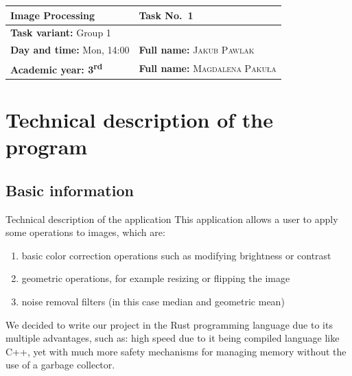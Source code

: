 \documentclass[12pt]{article}
\theoremstyle{definition}
\begin{document}
\pagestyle{fancy}
\fancyhead{}
\fancyfoot[C]{\thepage}

\thispagestyle{empty}
\renewcommand{\arraystretch}{2}
\begin{flushleft}
    \begin{tabularx}{0.95\textwidth}{|X|X|}
        \hline
        \bf \large Image Processing                   & \bf \large Task No.~1                           \\ \hline
        \multicolumn{2}{|l|}{
            \textbf{Task variant:} Group 1
        }                                                                                               \\ \hline
        \textbf{Day and time:} Mon, 14:00             & \textbf{Full name:} \textsc{Jakub Pawlak}       \\
        \textbf{Academic year: 3\textsuperscript{rd}} & \textbf{Full name:} \textsc{Magdalena Paku\l a} \\
        \hline
    \end{tabularx}
\end{flushleft}
\vspace{1em}
\renewcommand{\arraystretch}{1}

\section{Technical description of the program}
\subsection{Basic information}

Technical description of the application
This application allows a user to apply some operations to images, which are:
\begin{enumerate}
    \item basic color correction operations such as modifying brightness or contrast
    \item geometric operations, for example resizing or flipping the image
    \item noise removal filters (in this case median and geometric mean)
\end{enumerate}
We decided to write our project in the Rust programming language due to its multiple advantages, such as:
high speed due to it being compiled language like C++, yet with much more safety mechanisms for managing memory without the use of a garbage collector.
\end{document}

